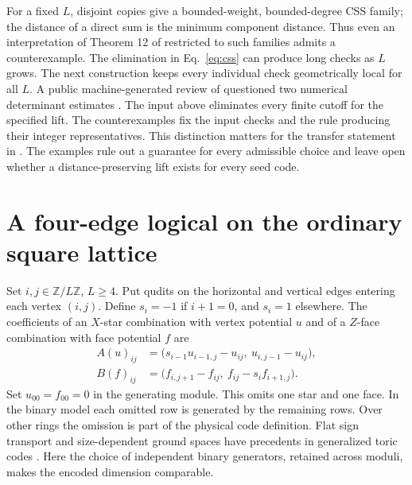 \documentclass[11pt]{article}
\newcommand{\Z}{\mathbb Z}
\begin{document}
For a fixed $L$, disjoint copies give a bounded-weight, bounded-degree CSS family; the distance of a direct sum is the minimum component distance. Thus even an interpretation of Theorem 12 of \cite{ldi26} restricted to such families admits a counterexample. The elimination in Eq.~\eqref{eq:css} can produce long checks as $L$ grows. The next construction keeps every individual check geometrically local for all $L$. A public machine-generated review of \cite{ldi26} questioned two numerical determinant estimates \cite{pith}. The input above eliminates every finite cutoff for the specified lift. The counterexamples fix the input checks and the rule producing their integer representatives. This distinction matters for the transfer statement in \cite[Thm.~22]{ldi24}. The examples rule out a guarantee for every admissible choice and leave open whether a distance-preserving lift exists for every seed code.

\section{A four-edge logical on the ordinary square lattice}
Set $i,j\in\Z/L\Z$, $L\ge4$. Put qudits on the horizontal and vertical edges entering each vertex $(i,j)$. Define $s_i=-1$ if $i+1=0$, and $s_i=1$ elsewhere. The coefficients of an $X$-star combination with vertex potential $u$ and of a $Z$-face combination with face potential $f$ are
\begin{align}
 A(u)_{ij}&=\big(s_{i-1}u_{i-1,j}-u_{ij},\ u_{i,j-1}-u_{ij}\big),\label{eq:star}\\
 B(f)_{ij}&=\big(f_{i,j+1}-f_{ij},\ f_{ij}-s_i f_{i+1,j}\big).\label{eq:face}
\end{align}
Set $u_{00}=f_{00}=0$ in the generating module. This omits one star and one face. In the binary model each omitted row is generated by the remaining rows. Over other rings the omission is part of the physical code definition. Flat sign transport and size-dependent ground spaces have precedents in generalized toric codes \cite{wcf}. Here the choice of independent binary generators, retained across moduli, makes the encoded dimension comparable.
\end{document}
